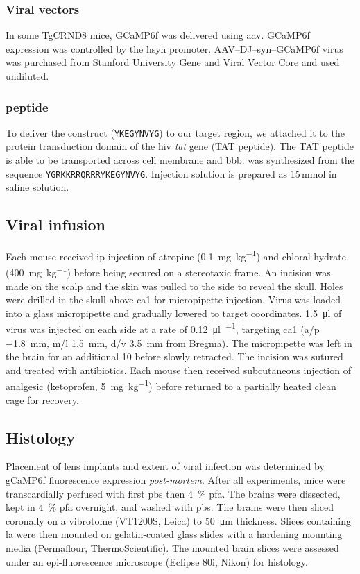 \subsubsection{Viral vectors}
In some TgCRND8 mice, GCaMP6f was delivered using \gls{aav}. GCaMP6f expression was controlled by the \gls{hsyn} promoter. AAV--DJ--syn--GCaMP6f virus was purchased from Stanford University Gene and Viral Vector Core and used undiluted. 

\subsubsection{\tglu{} peptide}
To deliver the \glu{} construct (\texttt{YKEGYNVYG}) to our target region, we attached it to the protein transduction domain of the \gls{hiv} \textit{tat} gene (TAT peptide). The TAT peptide is able to be transported across cell membrane and \gls{bbb}. \tglu{} was synthesized from the sequence \texttt{YGRKKRRQRRRYKEGYNVYG}. Injection solution is prepared as 15\,mmol \tglu{} in saline solution.


\subsection{Viral infusion}

Each mouse received \gls{ip} injection of atropine (\SI{0.1}{\mg\per\kg}) and chloral hydrate (\SI{400}{\mg\per\kg}) before being secured on a stereotaxic frame. An incision was made on the scalp and the skin was pulled to the side to reveal the skull. Holes were drilled in the skull above \gls{ca1} for micropipette injection. Virus was loaded into a glass micropipette and gradually lowered to target coordinates. \SI{1.5}{\ul} of virus was injected on each side at a rate of \SI{0.12}{\ul\per\min}, targeting \gls{ca1} (\gls{a/p} \SI{-1.8}{\mm}, \gls{m/l} \SI{1.5}{\mm}, \gls{d/v} \SI{3.5}{\mm} from Bregma). The micropipette was left in the brain for an additional \SI{10}{\min} before slowly retracted. The incision was sutured and treated with antibiotics. Each mouse then received subcutaneous injection of analgesic (ketoprofen, \SI{5}{\mg\per\kg}) before returned to a partially heated clean cage for recovery.

\subsection{Histology}
Placement of lens implants and extent of viral infection was determined by gCaMP6f fluorescence expression \textit{post-mortem}. After all experiments, mice were transcardially perfused with first \gls{pbs} then \SI{4}{\percent} \gls{pfa}. The brains were dissected,  kept in \SI{4}{\percent} \gls{pfa} overnight, and washed with \gls{pbs}. The brains were then sliced coronally on a vibrotome (VT1200S, Leica) to \SI{50}{\um} thickness. Slices containing \gls{la} were then mounted on gelatin-coated glass slides with a hardening mounting media (Permaflour, ThermoScientific). The mounted brain slices were assessed under an epi-fluorescence microscope (Eclipse 80i, Nikon) for histology.


